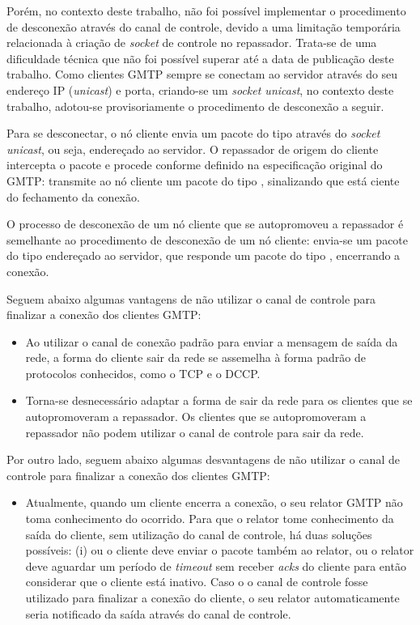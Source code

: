 Porém, no contexto deste trabalho, não foi possível implementar o procedimento de desconexão através do canal de controle, devido a uma limitação temporária relacionada à criação de \textit{socket} de controle no repassador. Trata-se de uma dificuldade técnica que não foi possível superar até a data de publicação deste trabalho.
Como clientes GMTP sempre se conectam ao servidor através do seu endereço IP (\textit{unicast}) e porta, criando-se um \textit{socket unicast}, no contexto deste trabalho, adotou-se provisoriamente o procedimento de desconexão a seguir.

Para se desconectar, o nó cliente envia um pacote do tipo  através do \textit{socket unicast}, ou seja, endereçado ao servidor. 
O repassador de origem do cliente intercepta o pacote e procede conforme definido na especificação original do GMTP: transmite ao nó cliente um pacote do tipo , sinalizando que está ciente do fechamento da conexão.

O processo de desconexão de um nó cliente que se autopromoveu a repassador é semelhante ao procedimento de desconexão de um nó cliente: envia-se um pacote do tipo  endereçado ao servidor, que responde um pacote do tipo , encerrando a conexão.

Seguem abaixo algumas vantagens de não utilizar o canal de controle para finalizar a conexão dos clientes GMTP:
\begin{itemize}
	\item Ao utilizar o canal de conexão padrão para enviar a mensagem de saída da rede, a forma do cliente sair da rede se assemelha à forma padrão de protocolos conhecidos, como o TCP e o DCCP.
	\item Torna-se desnecessário adaptar a forma de sair da rede para os clientes que se autopromoveram a repassador. Os clientes que se autopromoveram a repassador não podem utilizar o canal de controle para sair da rede.
\end{itemize}

Por outro lado, seguem abaixo algumas desvantagens de não utilizar o canal de controle para finalizar a conexão dos clientes GMTP:
\begin{itemize}
	\item Atualmente, quando um cliente encerra a conexão, o seu relator GMTP não toma conhecimento do ocorrido. Para que o relator tome conhecimento da saída do cliente, sem utilização do canal de controle, há duas soluções possíveis: (i) ou o cliente deve enviar o pacote  também ao relator, ou o relator deve aguardar um período de \textit{timeout} sem receber \textit{acks} do cliente para então considerar que o cliente está inativo. 
	Caso o o canal de controle fosse utilizado para finalizar a conexão do cliente, o seu relator automaticamente seria notificado da saída através do canal de controle.
\end{itemize}


